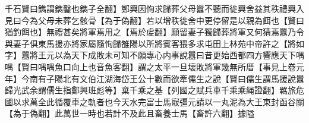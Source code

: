 千石賢曰鐫謂鐫鑿也鐫子全翻】鄭興因恂求歸葬父母囂不聽而徙興舍益其秩禮興入見曰今為父母未葬乞骸骨【為于偽翻】若以增秩徙舍中更停留是以親為餌也【賢曰猶釣餌也】無禮甚矣將軍焉用之【焉於䖍翻】願留妻子獨歸葬將軍又何猜焉囂乃令與妻子俱東馬援亦將家屬隨恂歸雒陽以所將賓客猥多求屯田上林苑中帝許之【將如字】囂將王元以為天下成敗未可知不願專心内事說囂曰昔更始西都四方響應天下喁喁【賢曰喁喁魚口向上也音魚客翻】謂之太平一旦壞敗將軍幾無所厝【事見上卷元年】今南有子陽北有文伯江湖海岱王公十數而欲牽儒生之說【賢曰儒生謂馬援說囂歸光武余謂儒生指鄭興班彪等】棄千乘之基【列國之賦兵車千乘乘䋲證翻】羈旅危國以求萬全此循覆車之軌者也今天水完富士馬㝡彊元請以一丸泥為大王東封函谷關【為于偽翻】此萬世一時也若計不及此且畜養士馬【畜許六翻】據隘
